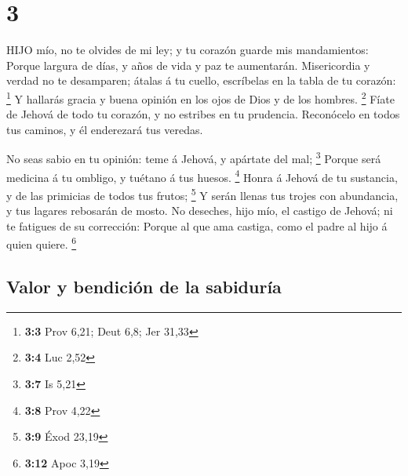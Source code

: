 \hypertarget{section-2}{%
\section{3}\label{section-2}}

 HIJO mío, no te olvides de mi ley; y tu corazón guarde mis
mandamientos:  Porque largura de días, y años de vida y paz
te aumentarán.  Misericordia y verdad no te desamparen;
átalas á tu cuello, escríbelas en la tabla de tu corazón: \footnote{\textbf{3:3}
  Prov 6,21; Deut 6,8; Jer 31,33}  Y hallarás gracia y buena
opinión en los ojos de Dios y de los hombres. \footnote{\textbf{3:4} Luc
  2,52}  Fíate de Jehová de todo tu corazón, y no estribes
en tu prudencia.  Reconócelo en todos tus caminos, y él
enderezará tus veredas.

 No seas sabio en tu opinión: teme á Jehová, y apártate del
mal; \footnote{\textbf{3:7} Is 5,21}  Porque será medicina á
tu ombligo, y tuétano á tus huesos. \footnote{\textbf{3:8} Prov 4,22}
 Honra á Jehová de tu sustancia, y de las primicias de todos
tus frutos; \footnote{\textbf{3:9} Éxod 23,19}  Y serán
llenas tus trojes con abundancia, y tus lagares rebosarán de mosto.
 No deseches, hijo mío, el castigo de Jehová; ni te
fatigues de su corrección:  Porque al que ama castiga, como
el padre al hijo á quien quiere. \footnote{\textbf{3:12} Apoc 3,19}

\hypertarget{valor-y-bendiciuxf3n-de-la-sabiduruxeda}{%
\subsection{Valor y bendición de la
sabiduría}\label{valor-y-bendiciuxf3n-de-la-sabiduruxeda}}

